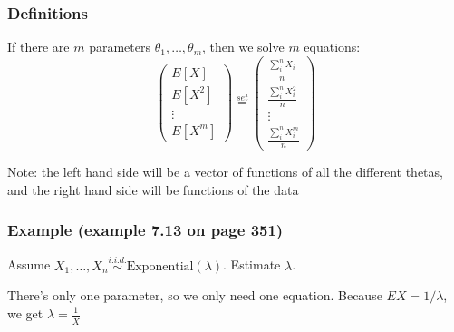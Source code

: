 \documentclass{beamer}
\begin{document}


\begin{frame}
\frametitle{Definitions}

If there are $m$ parameters $\theta_1, \ldots, \theta_m$, then we solve $m$ equations:
\[ 
\left( \begin{array}{c}
E[X]  \\
E[X^2]  \\
\vdots \\
E[X^m] \end{array} \right)
\overset{set}{=}
\left( \begin{array}{c}
\frac{\sum_i^n X_i}{n}  \\
\frac{\sum_i^n X^2_i}{n}  \\
\vdots \\
\frac{\sum_i^n X^m_i}{n}  \end{array} \right)
\] 

Note: the left hand side will be a vector of functions of all the different thetas, and the right hand side will be functions of the data
\end{frame}




\begin{frame}
\frametitle{Example (example 7.13 on page 351)}

Assume $X_1, \ldots, X_n \overset{i.i.d.}{\sim} \text{Exponential}(\lambda)$. Estimate $\lambda$. 
\newline
\pause

There's only one parameter, so we only need one equation.
Because $EX = 1/\lambda$, we get $\hat{\lambda} = \frac{1}{\bar{X}}$

\end{frame}

\end{document}
